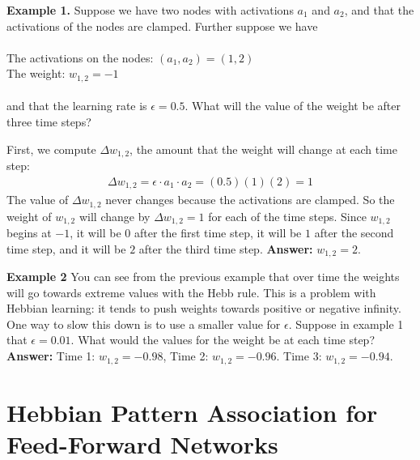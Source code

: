 
\bigskip

\noindent
{\bf Example 1.} Suppose we have two nodes with activations $a_1$ and $a_2$, and that the activations of the nodes are clamped. Further suppose we have \\ \\
\indent \qquad\qquad The activations on the nodes: $(a_1,a_2) = (1,2)$\\
\indent \qquad\qquad The weight: $w_{1,2} = -1$ \\ \\
and that the learning rate is $\epsilon =0.5$. What will the value of the  weight be after three time steps? 

First, we compute $\Delta w_{1,2}$, the  amount that the weight will change at each time step:
\begin{eqnarray*}
\Delta w_{1,2} = \epsilon \cdot a_1 \cdot a_2 = (0.5)(1)(2) = 1
\end{eqnarray*}
The value of $\Delta w_{1,2}$ never changes because the activations are 
clamped. So the weight of $w_{1,2}$ will change by $\Delta w_{1,2} = 1$ for
each of the time steps. Since $w_{1,2}$ begins at $-1$, it will be $0$ after 
the first time step, it will be $1$ after the second time step, and it will be 
$2$ after the third time step. {\bf Answer:} $w_{1,2} = 2$.

\bigskip

\noindent
{\bf Example 2} You can see from the previous example that over time the weights will 
go towards extreme values with the Hebb rule. This is a problem with Hebbian 
learning: it tends to push weights towards positive or negative infinity. One way to slow 
this down is to use a smaller value for $\epsilon$. Suppose in example 1 that
$\epsilon =  0.01$. What would the values for the weight be at each time step?
{\bf Answer:} Time 1: $w_{1,2} = -0.98$, Time 2: $w_{1,2} = -0.96$. Time 3:  $w_{1,2} = -0.94$.

\section{Hebbian Pattern Association for Feed-Forward Networks}\label{ff_associator}

